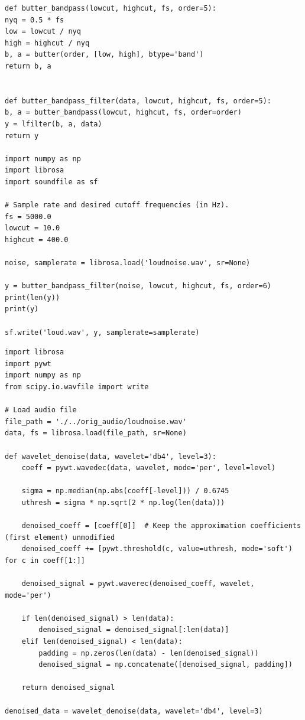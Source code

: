 \documentclass[conference]{IEEEtran}
\begin{document}
{\begin{lstlisting}[style=mypython, caption={Python code for Butterworth band-pass filter}]
def butter_bandpass(lowcut, highcut, fs, order=5):
nyq = 0.5 * fs
low = lowcut / nyq
high = highcut / nyq
b, a = butter(order, [low, high], btype='band')
return b, a


def butter_bandpass_filter(data, lowcut, highcut, fs, order=5):
b, a = butter_bandpass(lowcut, highcut, fs, order=order)
y = lfilter(b, a, data)
return y

import numpy as np
import librosa
import soundfile as sf

# Sample rate and desired cutoff frequencies (in Hz).
fs = 5000.0
lowcut = 10.0
highcut = 400.0

noise, samplerate = librosa.load('loudnoise.wav', sr=None)

y = butter_bandpass_filter(noise, lowcut, highcut, fs, order=6)
print(len(y))
print(y)

sf.write('loud.wav', y, samplerate=samplerate)
\end{lstlisting}



\begin{lstlisting}[style=mypython, caption={Code for cleaning the sound using wavelet transform}, label={lst:mel-spectrogram}]
import librosa
import pywt
import numpy as np
from scipy.io.wavfile import write

# Load audio file
file_path = './../orig_audio/loudnoise.wav'  
data, fs = librosa.load(file_path, sr=None)

def wavelet_denoise(data, wavelet='db4', level=3):
    coeff = pywt.wavedec(data, wavelet, mode='per', level=level)

    sigma = np.median(np.abs(coeff[-level])) / 0.6745
    uthresh = sigma * np.sqrt(2 * np.log(len(data)))

    denoised_coeff = [coeff[0]]  # Keep the approximation coefficients (first element) unmodified
    denoised_coeff += [pywt.threshold(c, value=uthresh, mode='soft') for c in coeff[1:]]

    denoised_signal = pywt.waverec(denoised_coeff, wavelet, mode='per')

    if len(denoised_signal) > len(data):
        denoised_signal = denoised_signal[:len(data)]
    elif len(denoised_signal) < len(data):
        padding = np.zeros(len(data) - len(denoised_signal))
        denoised_signal = np.concatenate([denoised_signal, padding])
    
    return denoised_signal

denoised_data = wavelet_denoise(data, wavelet='db4', level=3)


\end{lstlisting}}
\end{document}
